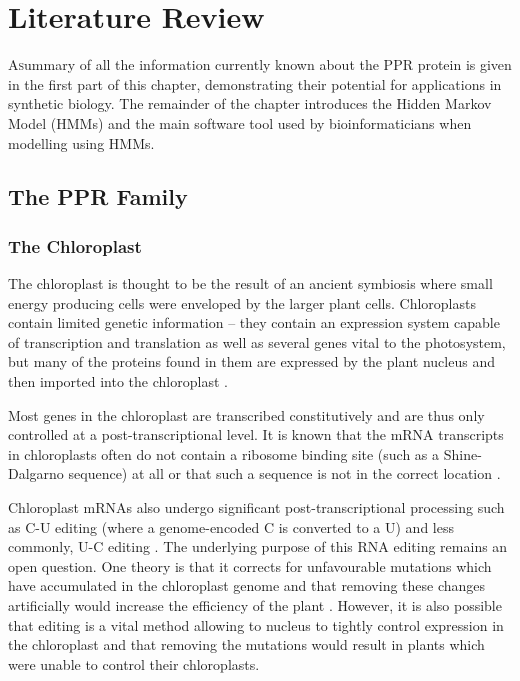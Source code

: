 
\chapter{Literature Review}
\label{chap:theory}

\lettrine{A} summary of all the information currently known about the PPR 
protein is given
in the first part of this chapter, demonstrating their potential for
applications in synthetic biology.
The remainder of the chapter introduces the Hidden Markov Model (HMMs) and the 
main software tool used by bioinformaticians when modelling using HMMs.

\section{The PPR Family}
\label{sec:review_PPR}

\subsection{The Chloroplast}

The chloroplast is thought to be the result of an ancient symbiosis where
small energy producing cells were enveloped by the larger plant cells.
Chloroplasts contain limited genetic information -- they contain an expression 
system capable of transcription and translation as well as several genes 
vital to the photosystem, but many of the proteins found in them are 
expressed by the plant nucleus and then imported into the chloroplast
\cite{Kurland2000,Bhattacharya2007}.

Most genes in the chloroplast are transcribed constitutively\cite{Sugita1996}
and are thus only controlled at a post-transcriptional level.
It is known that the mRNA transcripts in chloroplasts often do not contain a
ribosome binding site (such as a Shine-Dalgarno sequence) at all or that such a
sequence is not in the correct location \cite{Sugiura1998,Zerges2000}.

Chloroplast mRNAs also undergo significant post-transcriptional processing such
as C-U editing (where a genome-encoded C is converted to a U) and less 
commonly, U-C editing \cite{Castandet2011}.
The underlying purpose of this RNA editing remains an open question. 
One theory is that it corrects for unfavourable mutations which have
accumulated in the chloroplast genome and that removing these changes 
artificially would increase the efficiency of the plant \cite{Fujii2011}.
However, it is also possible that editing is a vital method allowing to nucleus
to tightly control expression in the chloroplast and that removing the 
mutations would result in plants which were unable to control their 
chloroplasts.

